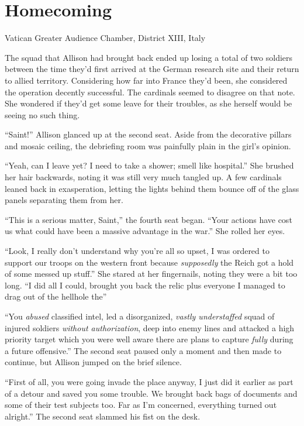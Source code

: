 \chapter{Homecoming}
\begin{ChapterNote}
Vatican Greater Audience Chamber, District XIII, Italy
\end{ChapterNote}
\begin{Standard}
The squad that Allison had brought back ended up losing a total of two soldiers
between the time they'd first arrived at the German research site and their return
to allied territory. Considering how far into France they'd been, she considered
the operation decently successful. The cardinals seemed to disagree on that note.
She wondered if they'd get some leave for their troubles, as she herself would be
seeing no such thing.

``Saint!'' Allison glanced up at the second seat. Aside from the decorative pillars
and mosaic ceiling, the debriefing room was painfully plain in the girl's opinion.

``Yeah, can I leave yet? I need to take a shower; smell like hospital.'' She brushed
her hair backwards, noting it was still very much tangled up. A few cardinals leaned back
in exasperation, letting the lights behind them bounce off of the glass panels separating
them from her.

``This is a serious matter, Saint,'' the fourth seat began. ``Your actions have cost us
what could have been a massive advantage in the war.'' She rolled her eyes.

``Look, I really don't understand why you're all so upset, I was ordered to support
our troops on the western front because \emph{supposedly} the Reich got a hold of
some messed up stuff.'' She stared at her fingernails, noting they were a bit too long.
``I did all I could, brought you back the relic plus everyone I managed to drag out of the
hellhole the\textemdash{}''

``You \emph{abused} classified intel, led a disorganized, \emph{vastly understaffed} squad
of injured soldiers \emph{without authorization}, deep into enemy lines and attacked
a high priority target which you were well aware there are plans to capture \emph{fully} during
a future offensive.'' The second seat paused only a moment and then made to continue, but
Allison jumped on the brief silence.

``First of all, you were going invade the place anyway, I just did it earlier as part of
a detour and saved you some trouble. We brought back bags of documents and some of their
test subjects too. Far as I'm concerned, everything turned out alright.'' The second seat
slammed his fist on the desk.


\end{Standard}
